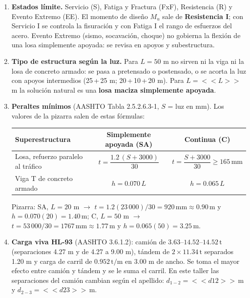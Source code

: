 \documentclass[11pt,a4paper]{article}
\newcommand{\uT}{\,\mathrm{t}}
\newcommand{\uTpm}{\,\mathrm{t/m}}
\newcommand{\uM}{\,\mathrm{m}}
\newcommand{\uMm}{\,\mathrm{mm}}
\begin{document}
\begin{enumerate}[leftmargin=*,label=\textbf{\arabic*.},itemsep=3pt]
\item \textbf{Estados límite.} Servicio (S), Fatiga y Fractura (FxF), Resistencia (R) y Evento Extremo (EE).
  El momento de diseño $M_u$ sale de \textbf{Resistencia I}; con Servicio I se controla la fisuración y con
  Fatiga I el rango de esfuerzos del acero. Evento Extremo (sismo, socavación, choque) no gobierna la flexión
  de una losa simplemente apoyada: se revisa en apoyos y subestructura.
\item \textbf{Tipo de estructura según la luz.} Para $L = 50$ m no sirven ni la viga ni la losa de concreto
  armado: se pasa a pretensado o postensado, o se acorta la luz con apoyos intermedios (25\,+\,25 m;
  20\,+\,10\,+\,20 m). Para $L = <<L>>$ m la solución natural es una \textbf{losa maciza simplemente apoyada}.
\item \textbf{Peraltes mínimos} (AASHTO Tabla 2.5.2.6.3-1, $S$ = luz en mm). Los valores de la pizarra
  salen de estas fórmulas:

  \begin{center}\small
  \begin{tabular}{lcc}
  \toprule
  Superestructura & Simplemente apoyada (SA) & Continua (C)\\
  \midrule
  Losa, refuerzo paralelo al tráfico & $t = \dfrac{1.2\,(S+3000)}{30}$ & $t = \dfrac{S+3000}{30} \ge 165\uMm$\\[10pt]
  Viga T de concreto armado & $h = 0.070\,L$ & $h = 0.065\,L$\\
  \bottomrule
  \end{tabular}
  \end{center}
  Pizarra: SA, $L = 20$ m $\rightarrow$ $t = 1.2(23\,000)/30 = 920\uMm \approx 0.90\uM$ y $h = 0.070(20) = 1.40\uM$;
  C, $L = 50$ m $\rightarrow$ $t = 53\,000/30 = 1767\uMm \approx 1.77\uM$ y $h = 0.065(50) = 3.25\uM$.
\item \textbf{Carga viva HL-93} (AASHTO 3.6.1.2): camión de $3.63$--$14.52$--$14.52\uT$ (separaciones 4.27 m y
  de 4.27 a 9.00 m), tándem de $2\times 11.34\uT$ separados 1.20 m y carga de carril de $0.952\uTpm$ en 3.00 m
  de ancho. Se toma el mayor efecto entre camión y tándem y se le suma el carril. En este taller las
  separaciones del camión cambian según el apellido: $d_{1-2} = <<d12>>\uM$ y $d_{2-3} = <<d23>>\uM$.
\end{enumerate}

\end{document}
